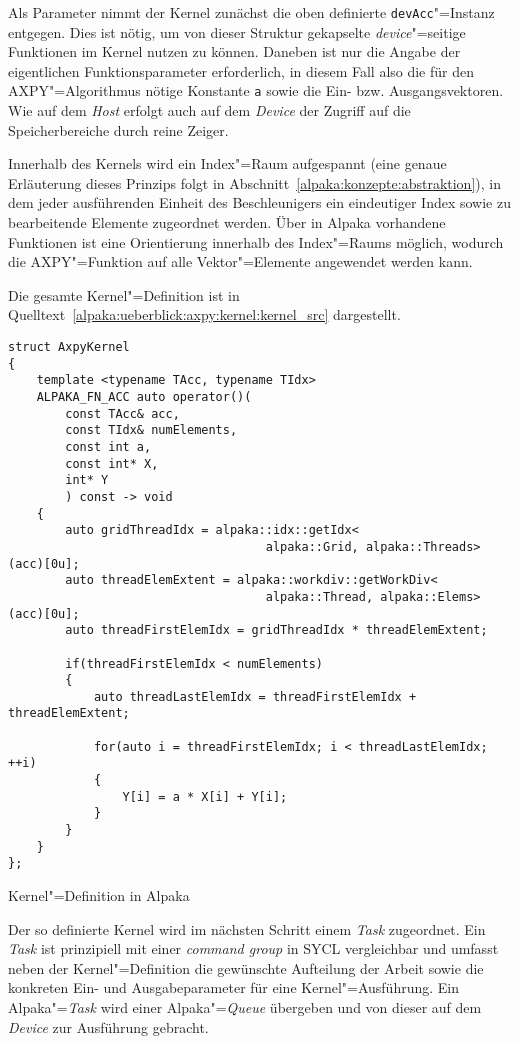 Als Parameter nimmt der Kernel zunächst die oben definierte
\texttt{devAcc}"=Instanz entgegen. Dies ist nötig, um von dieser Struktur
gekapselte \textit{device}"=seitige Funktionen im Kernel nutzen zu können.
Daneben ist nur die Angabe der eigentlichen Funktionsparameter erforderlich,
in diesem Fall also die für den AXPY"=Algorithmus nötige Konstante \texttt{a}
sowie die Ein- bzw. Ausgangsvektoren. Wie auf dem \textit{Host} erfolgt auch auf
dem \textit{Device} der Zugriff auf die Speicherbereiche durch reine Zeiger.

Innerhalb des Kernels wird ein Index"=Raum aufgespannt (eine genaue Erläuterung
dieses Prinzips folgt in Abschnitt~\ref{alpaka:konzepte:abstraktion}), in dem
jeder ausführenden Einheit des Beschleunigers ein eindeutiger Index sowie zu
bearbeitende Elemente zugeordnet werden. Über in Alpaka vorhandene Funktionen
ist eine Orientierung innerhalb des Index"=Raums möglich, wodurch die
AXPY"=Funktion auf alle Vektor"=Elemente angewendet werden kann.

Die gesamte Kernel"=Definition ist in
Quelltext~\ref{alpaka:ueberblick:axpy:kernel:kernel_src} dargestellt.

\begin{code}
    \begin{verbatim}
struct AxpyKernel
{
    template <typename TAcc, typename TIdx>
    ALPAKA_FN_ACC auto operator()(
        const TAcc& acc,
        const TIdx& numElements,
        const int a,
        const int* X,
        int* Y
        ) const -> void
    {
        auto gridThreadIdx = alpaka::idx::getIdx<
                                    alpaka::Grid, alpaka::Threads>(acc)[0u];
        auto threadElemExtent = alpaka::workdiv::getWorkDiv<
                                    alpaka::Thread, alpaka::Elems>(acc)[0u];
        auto threadFirstElemIdx = gridThreadIdx * threadElemExtent;

        if(threadFirstElemIdx < numElements)
        {
            auto threadLastElemIdx = threadFirstElemIdx + threadElemExtent;
            
            for(auto i = threadFirstElemIdx; i < threadLastElemIdx; ++i)
            {
                Y[i] = a * X[i] + Y[i];
            }
        }
    }
};
    \end{verbatim}
    \caption{Kernel"=Definition in Alpaka}
    \label{alpaka:ueberblick:axpy:kernel:kernel_src}
\end{code}

Der so definierte Kernel wird im nächsten Schritt einem \textit{Task}
zugeordnet. Ein \textit{Task} ist prinzipiell mit einer \textit{command group}
in SYCL vergleichbar und umfasst neben der Kernel"=Definition die gewünschte
Aufteilung der Arbeit sowie die konkreten Ein- und Ausgabeparameter für eine
Kernel"=Ausführung. Ein Alpaka"=\textit{Task} wird einer Alpaka"=\textit{Queue}
übergeben und von dieser auf dem \textit{Device} zur Ausführung gebracht.

